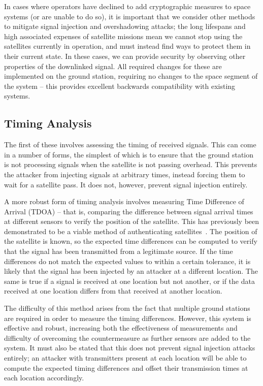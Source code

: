 In cases where operators have declined to add cryptographic measures to space systems (or are unable to do so), it is important that we consider other methods to mitigate signal injection and overshadowing attacks; the long lifespans and high associated expenses of satellite missions mean we cannot stop using the satellites currently in operation, and must instead find ways to protect them in their current state.
In these cases, we can provide security by observing other properties of the downlinked signal.
All required changes for these are implemented on the ground station, requiring no changes to the space segment of the system -- this provides excellent backwards compatibility with existing systems.


\subsection{Timing Analysis}

The first of these involves assessing the timing of received signals.
This can come in a number of forms, the simplest of which is to ensure that the ground station is not processing signals when the satellite is not passing overhead.
This prevents the attacker from injecting signals at arbitrary times, instead forcing them to wait for a satellite pass.
It does not, however, prevent signal injection entirely.

A more robust form of timing analysis involves measuring Time Difference of Arrival (TDOA) -- that is, comparing the difference between signal arrival times at different sensors to verify the position of the satellite.
This has previously been demonstrated to be a viable method of authenticating satellites~\cite{jedermann2021orbit}.
The position of the satellite is known, so the expected time differences can be computed to verify that the signal has been transmitted from a legitimate source.
If the time differences do not match the expected values to within a certain tolerance, it is likely that the signal has been injected by an attacker at a different location.
The same is true if a signal is received at one location but not another, or if the data received at one location differs from that received at another location.

The difficulty of this method arises from the fact that multiple ground stations are required in order to measure the timing differences.
However, this system is effective and robust, increasing both the effectiveness of measurements and difficulty of overcoming the countermeasure as further sensors are added to the system.
It must also be stated that this does not prevent signal injection attacks entirely; an attacker with transmitters present at each location will be able to compute the expected timing differences and offset their transmission times at each location accordingly.


